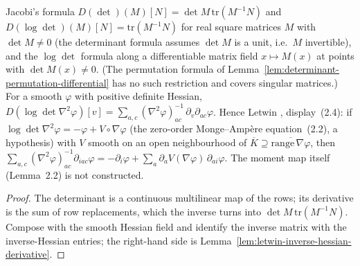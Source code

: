 \begin{lemma}
  \label{lem:letwin-monge-ampere-first}
  \leanok
  Jacobi's formula $D(\det)(M)[N]=\det M\,\mathrm{tr}(M^{-1}N)$ and $D(\log\det)(M)[N]=\mathrm{tr}(M^{-1}N)$ for
  real square matrices $M$ with $\det M\ne0$ (the determinant formula assumes $\det M$ is a unit, i.e.\ $M$ invertible), and the
  $\log\det$ formula along a differentiable matrix field $x\mapsto M(x)$ at points with $\det M(x)\ne0$. (The permutation formula of
  Lemma~\ref{lem:determinant-permutation-differential} has no such restriction and covers singular matrices.)  For a smooth $\varphi$ with positive
  definite Hessian, $D(\log\det\nabla^2\varphi)[v]=\sum_{a,c}(\nabla^2\varphi)^{-1}_{ac}\,\partial_v\partial_{ac}\varphi$.
  Hence Letwin \cite{Letwin2026QuadraticKLS}, display~(2.4): if $\log\det\nabla^2\varphi=-\varphi+V\circ\nabla\varphi$
  (the zero-order Monge--Amp\`ere equation~(2.2), a hypothesis) with $V$ smooth on an open neighbourhood of
  $\overline K\supseteq\overline{\mathrm{range}\,\nabla\varphi}$, then
  $\sum_{a,c}(\nabla^2\varphi)^{-1}_{ac}\partial_{iac}\varphi=-\partial_i\varphi+\sum_a\partial_aV(\nabla\varphi)\,\partial_{ai}\varphi$.
  The moment map itself (Lemma~2.2) is not constructed.
\end{lemma}
\begin{proof}
  \leanok
  The determinant is a continuous multilinear map of the rows; its derivative is the sum of row
  replacements, which the inverse turns into $\det M\,\mathrm{tr}(M^{-1}N)$.  Compose with the smooth
  Hessian field and identify the inverse matrix with the inverse-Hessian entries; the right-hand side
  is Lemma~\ref{lem:letwin-inverse-hessian-derivative}.
\end{proof}

